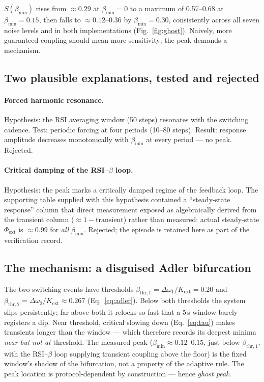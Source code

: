\documentclass[11pt]{article}
\newcommand{\bmin}{\beta_{\min}}
\newcommand{\dw}{\Delta\omega}
\begin{document}
$S(\bmin)$ rises from $\approx 0.29$ at $\bmin=0$ to a maximum of 0.57--0.68 at
$\bmin=0.15$, then falls to $\approx 0.12$--$0.36$ by $\bmin=0.30$,
consistently across all seven noise levels and in both implementations
(Fig.~\ref{fig:ghost}). Naively, more guaranteed coupling should mean more
sensitivity; the peak demands a mechanism.

\subsection{Two plausible explanations, tested and rejected}\label{sec:rejected}

\paragraph{Forced harmonic resonance.} Hypothesis: the RSI averaging window
(50 steps) resonates with the switching cadence. Test: periodic forcing at
four periods (10--80 steps). Result: response amplitude decreases
monotonically with $\bmin$ at every period --- no peak. Rejected.

\paragraph{Critical damping of the RSI--$\beta$ loop.} Hypothesis: the peak
marks a critically damped regime of the feedback loop. The supporting table
supplied with this hypothesis contained a ``steady-state response'' column
that direct measurement exposed as algebraically derived from the transient
column ($\approx 1 - \text{transient}$) rather than measured: actual
steady-state $\Phi_{\mathrm{ext}}$ is $\approx 0.99$ for \emph{all} $\bmin$.
Rejected; the episode is retained here as part of the verification record.

\subsection{The mechanism: a disguised Adler bifurcation}

The two switching events have thresholds
$\beta_{\mathrm{thr},1} = \dw_1/K_{\mathrm{ext}} = 0.20$ and
$\beta_{\mathrm{thr},2} = \dw_2/K_{\mathrm{ext}} \approx 0.267$
(Eq.~\eqref{eq:adler}). Below both thresholds the system slips persistently;
far above both it relocks so fast that a 5\,s window barely registers a dip.
Near threshold, critical slowing down (Eq.~\eqref{eq:tau}) makes transients
longer than the window --- which therefore records its deepest minima
\emph{near but not at} threshold. The measured peak ($\bmin \approx 0.12$--$0.15$,
just below $\beta_{\mathrm{thr},1}$, with the RSI--$\beta$ loop supplying
transient coupling above the floor) is the fixed window's shadow of the
bifurcation, not a property of the adaptive rule. The peak location is
protocol-dependent by construction --- hence \emph{ghost peak}.
\end{document}
